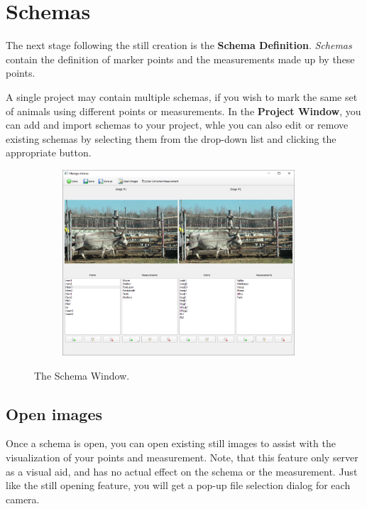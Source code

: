 \documentclass[10pt,a4paper,oneside]{report}             %
\begin{document}
\section{Schemas}

The next stage following the still creation is the \textbf{Schema Definition}. \textit{Schemas} contain the definition of marker points and the measurements made up by these points.

A single project may contain multiple schemas, if you wish to mark the same set of animals using different points or measurements. In the \textbf{Project Window}, you can add and import schemas to your project, whle you can also edit or remove existing schemas by selecting them from the drop-down list and clicking the appropriate button.

\begin{figure}[H]
	\centering
	\begin{subfigure}{\textwidth}
		\centering 
		\includegraphics[width=0.95\textwidth]{./images/SchemW.png}
	\end{subfigure}
	\caption[]
	{\small  The Schema Window.}
\end{figure} 

\subsection{Open images}

Once a schema is open, you can open existing still images to assist with the visualization of your points and measurement. Note, that this feature only server as a visual aid, and has no actual effect on the schema or the measurement. Just like the still opening feature, you will get a pop-up file selection dialog for each camera.
\end{document}
